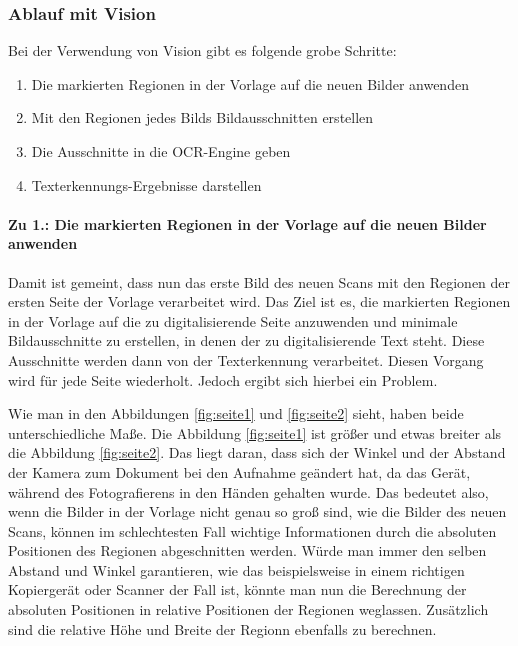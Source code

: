 \documentclass[nomenclature, oneside, 150]{HSMW-Thesis}
\begin{document}
			\subsubsection{Ablauf mit Vision}
				Bei der Verwendung von Vision gibt es folgende grobe Schritte:
				\begin{enumerate}
					\item Die markierten Regionen in der Vorlage auf die neuen Bilder anwenden
					\item Mit den Regionen jedes Bilds Bildausschnitten erstellen
					\item Die Ausschnitte in die OCR-Engine geben
					\item Texterkennungs-Ergebnisse darstellen
				\end{enumerate}
			
				\paragraph{Zu 1.: Die markierten Regionen in der Vorlage auf die neuen Bilder anwenden}
				Damit ist gemeint, dass nun das erste Bild des neuen Scans mit den Regionen der ersten Seite der Vorlage verarbeitet wird. Das Ziel ist es, die markierten Regionen in der Vorlage auf die zu digitalisierende Seite anzuwenden und minimale Bildausschnitte zu erstellen, in denen der zu digitalisierende Text steht. Diese Ausschnitte werden dann von der Texterkennung verarbeitet. Diesen Vorgang wird für jede Seite wiederholt. Jedoch ergibt sich hierbei ein Problem.
				
				Wie man in den Abbildungen \ref{fig:seite1} und \ref{fig:seite2} sieht, haben beide unterschiedliche Maße. Die Abbildung \ref{fig:seite1} ist größer und etwas breiter als die Abbildung \ref{fig:seite2}. Das liegt daran, dass sich der Winkel und der Abstand der Kamera zum Dokument bei den Aufnahme geändert hat, da das Gerät, während des Fotografierens in den Händen gehalten wurde. Das bedeutet also, wenn die Bilder in der Vorlage nicht genau so groß sind, wie die Bilder des neuen Scans, können im schlechtesten Fall wichtige Informationen durch die absoluten Positionen des Regionen abgeschnitten werden. Würde man immer den selben Abstand und Winkel garantieren, wie das beispielsweise in einem richtigen Kopiergerät oder Scanner der Fall ist, könnte man nun die Berechnung der absoluten Positionen in relative Positionen der Regionen weglassen. Zusätzlich sind die relative Höhe und Breite der Regionn ebenfalls zu berechnen. 
\end{document}
